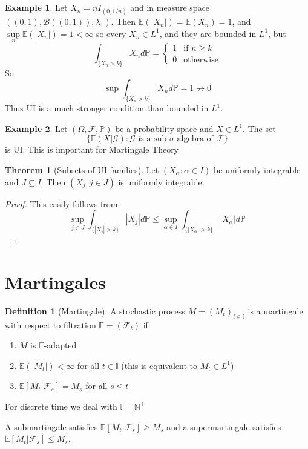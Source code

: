 \documentclass[11pt,a4paper]{article}
\theoremstyle{definition}
\newtheorem{definition}{Definition}[section]
\newtheorem{theorem}{Theorem}[section]
\newtheorem{example}{Example}[section]
\begin{document}
\begin{example}
    Let $X_n = nI_{(0, 1/n)}$ and in measure space $((0,1), \mathcal{B}((0,1)), \lambda_1)$. Then $\mathbb{E}(|X_n|) = \mathbb{E}(X_n) = 1$, and $\sup \limits _n \mathbb{E}(|X_n|) = 1 < \infty$ so every $X_n \in L^1$, and they are bounded in $L^1$, but \[
    \int _{\{X_n > k\}} X_n d\mathbb{P}= \begin{cases}
        1 & \text{if } n \ge k \\ 0 & \text{otherwise}
    \end{cases}
    \]
    So \[
    \sup \int _{\{X_n > k\}} X_n d\mathbb{P} = 1 \not \to 0
    \]
    Thus UI is a much stronger condition than bounded in $L^1$.
\end{example}

\begin{example}
    Let $(\Omega, \mathcal{F}, \mathbb{P})$ be a probability space and $X \in L^1$. The set \[
    \{\mathbb{E}(X|\mathcal{G}): \mathcal{G} \text{ is a sub } \sigma \text{-algebra of } \mathcal{F}\}
    \]
    is UI. This is important for Martingale Theory
\end{example}

\begin{theorem}[Subsets of UI families]
    Let $(X_\alpha: \alpha \in I)$ be uniformly integrable and $J \subseteq I$. Then $(X_j: j \in J)$ is uniformly integrable.
\end{theorem}

\begin{proof}
This easily follows from \[
\sup \limits _{j \in J} \int _{\{|X_j| > k\}} |X_j| d\mathbb{P} \le \sup \limits _{\alpha \in I} \int _{\{|X_\alpha| > k\}} |X_\alpha| d\mathbb{P}
\]
\end{proof}

\newpage

\section{Martingales}


\begin{definition}[Martingale]\label{def:martingale}
A stochastic process $M = (M_t)_{t \in \mathbb{I}}$ is a martingale with respect to filtration $\mathbb{F} = (\mathcal{F}_t)$ if:
\begin{enumerate}
    \item $M$ is $\mathbb{F}$-adapted
    \item $\mathbb{E}(|M_t|) < \infty$ for all $t \in \mathbb{I}$ (this is equivalent to $M_t \in L^1$)
    \item $\mathbb{E}[M_{t}|\mathcal{F}_s] = M_s$ for all $s \le t$
\end{enumerate}
For discrete time we deal with $\mathbb{I} = \mathbb{N}^+$
\end{definition}
\noindent
A submartingale satisfies $\mathbb{E}[M_{t}|\mathcal{F}_s] \geq M_s$ and a supermartingale satisfies $\mathbb{E}[M_{t}|\mathcal{F}_s] \leq M_s$.
\end{document}
